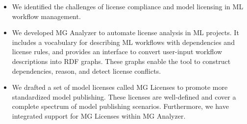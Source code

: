 \begin{itemize}
    \item We identified the challenges of license compliance and model licensing in ML workflow management.
    
    \item We developed MG Analyzer to automate license analysis in ML projects. It includes a vocabulary for describing ML workflows with dependencies and license rules, and provides an interface to convert user-input workflow descriptions into RDF graphs. These graphs enable the tool to construct dependencies, reason, and detect license conflicts.
    \item We drafted a set of model licenses called MG Licenses to promote more standardized model publishing. These licenses are well-defined and cover a complete spectrum of model publishing scenarios. Furthermore, we have integrated support for MG Licenses within MG Analyzer.
\end{itemize}


